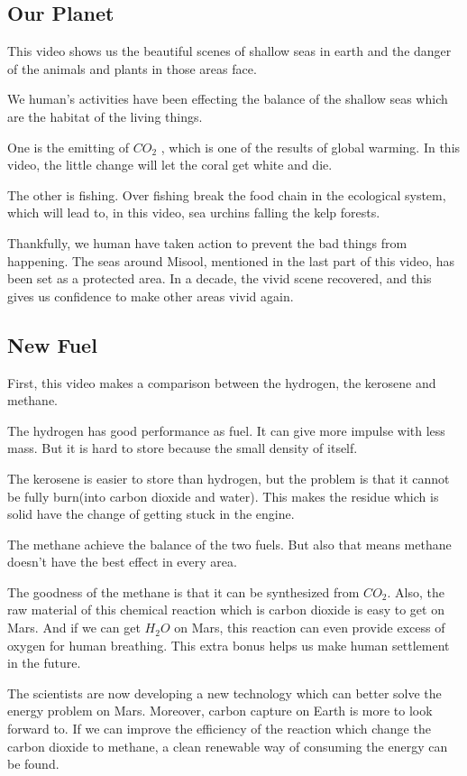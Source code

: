 \documentclass{article}
\begin{document}
\subsection{Our Planet} This video shows us the beautiful scenes of shallow seas in earth and the danger of the animals
 and plants in those areas face.

We human's activities have been effecting the balance of the shallow seas which are the habitat of the living things.

One is the emitting of $CO_2$ , which is one of the results of global warming. In this video, the little change will let
the coral get white and die.

The other is fishing. Over fishing break the food chain in the ecological system, which will lead to, in this video, sea
urchins falling the kelp forests.

Thankfully, we human have taken action to prevent the bad things from happening. The seas around Misool, mentioned in
the last part of this video, has been set as a protected area. In a decade, the vivid scene recovered, and this gives
us confidence to make other areas vivid again.

\subsection{New Fuel} First, this video makes a comparison between the hydrogen, the kerosene and methane.

The hydrogen has good performance as fuel. It can give more impulse with less mass. But it is hard to store because the
small density of itself.

The kerosene is easier to store than hydrogen, but the problem is that it cannot be fully burn(into carbon dioxide and
water). This makes the residue which is solid have the change of getting stuck in the engine.

The methane achieve the balance of the two fuels. But also that means methane doesn't have the best effect in every
area.

The goodness of the methane is that it can be synthesized from $CO_2$. Also, the raw material of this chemical reaction
which is carbon dioxide is easy to get on Mars. And if we can get $H_2O$ on Mars, this reaction can even provide excess
of oxygen for human breathing. This extra bonus helps us make human settlement in the future.

The scientists are now developing a new technology which can better solve the energy problem on Mars. Moreover, carbon
capture on Earth is more to look forward to. If we can improve the efficiency of the reaction which change the carbon
dioxide to methane, a clean renewable way of consuming the energy can be found.
\end{document}
